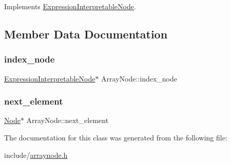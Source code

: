 Implements \hyperlink{classExpressionInterpretableNode_a43650f046c48fc539f77a207e3c9181e}{Expression\+Interpretable\+Node}.



\subsection{Member Data Documentation}
\mbox{\label{classArrayNode_a949140f67149544aec59044dcae07036}} 
\subsubsection{\texorpdfstring{index\+\_\+node}{index\_node}}
{\footnotesize\ttfamily \hyperlink{classExpressionInterpretableNode}{Expression\+Interpretable\+Node}$\ast$ Array\+Node\+::index\+\_\+node}

\mbox{\label{classArrayNode_aa3bccfaecfe5597fd494ee56cae918dd}} 
\subsubsection{\texorpdfstring{next\+\_\+element}{next\_element}}
{\footnotesize\ttfamily \hyperlink{classNode}{Node}$\ast$ Array\+Node\+::next\+\_\+element}



The documentation for this class was generated from the following file\+:\begin{DoxyCompactItemize}
\item 
include/\hyperlink{arraynode_8h}{arraynode.\+h}\end{DoxyCompactItemize}

